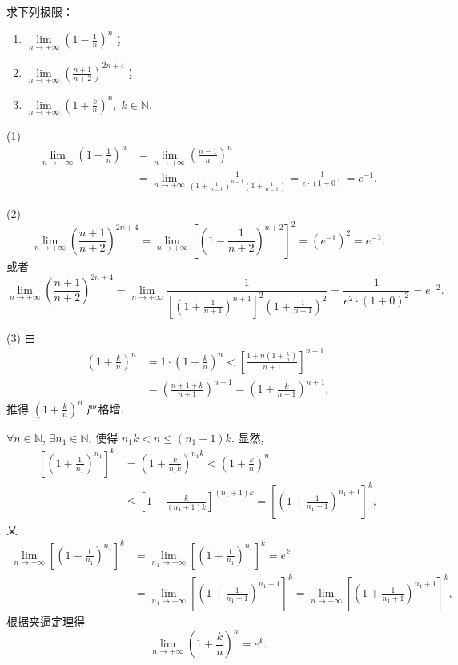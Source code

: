 \begin{example}\label{ex:1.4.8}
求下列极限：
\begin{enumerate}
\item $\lim\limits_{n \to +\infty} \left(1 - \frac{1}{n}\right)^n$；
\item $\lim\limits_{n \to +\infty} \left(\frac{n+1}{n+2}\right)^{2n+4}$；
\item $\lim\limits_{n \to +\infty} \left(1 + \frac{k}{n}\right)^n,\; k \in \mathbb{N}$.
\end{enumerate}
\end{example}

\begin{solution}
(1) 
\[
\begin{aligned}
\lim_{n\to+\infty}\left(1 - \frac{1}{n}\right)^{n} &= \lim_{n\to+\infty}\left(\frac{n-1}{n}\right)^{n} \\
&= \lim_{n\to+\infty}\frac{1}{\left(1 + \frac{1}{n-1}\right)^{n-1}\left(1 + \frac{1}{n-1}\right)} = \frac{1}{e\cdot(1 + 0)} = e^{-1}.
\end{aligned}
\]

(2) 
\[
\lim_{n\to+\infty}\left(\frac{n+1}{n+2}\right)^{2n+4} = \lim_{n\to+\infty}\left[\left(1 - \frac{1}{n+2}\right)^{n+2}\right]^2 = (e^{-1})^2 = e^{-2}.
\]
或者
\[
\lim_{n\to+\infty}\left(\frac{n+1}{n+2}\right)^{2n+4} = \lim_{n\to+\infty}\frac{1}{\left[\left(1 + \frac{1}{n+1}\right)^{n+1}\right]^{2}\left(1 + \frac{1}{n+1}\right)^{2}} = \frac{1}{e^{2}\cdot(1 + 0)^{2}} = e^{-2}.
\]

(3) 由
\[
\begin{aligned}
\left(1 + \frac{k}{n}\right)^{n} &= 1 \cdot \left(1 + \frac{k}{n}\right)^{n} < \left[\frac{1 + n\left(1 + \frac{k}{n}\right)}{n+1}\right]^{n+1} \\
&= \left(\frac{n+1+k}{n+1}\right)^{n+1} = \left(1 + \frac{k}{n+1}\right)^{n+1},
\end{aligned}
\]
推得 $\left(1 + \frac{k}{n}\right)^{n}$ 严格增.

$\forall n \in \mathbb{N}$, $\exists n_1 \in \mathbb{N}$, 使得 $n_1 k < n \leqslant (n_1 + 1)k$. 显然,
\[
\begin{aligned}
\left[\left(1 + \frac{1}{n_{1}}\right)^{n_{1}}\right]^{k} &= \left(1 + \frac{k}{n_{1}k}\right)^{n_{1}k} < \left(1 + \frac{k}{n}\right)^{n} \\
&\leqslant \left[1 + \frac{k}{(n_{1}+1)k}\right]^{(n_{1}+1)k} = \left[\left(1 + \frac{1}{n_{1}+1}\right)^{n_{1}+1}\right]^{k},
\end{aligned}
\]
又
\[
\begin{aligned}
\lim_{n\to+\infty}\left[\left(1 + \frac{1}{n_{1}}\right)^{n_{1}}\right]^{k} &= \lim_{n_{1}\to+\infty}\left[\left(1 + \frac{1}{n_{1}}\right)^{n_{1}}\right]^{k} = e^{k} \\
&= \lim_{n_{1}\to+\infty}\left[\left(1 + \frac{1}{n_{1}+1}\right)^{n_{1}+1}\right]^{k} = \lim_{n\to+\infty}\left[\left(1 + \frac{1}{n_{1}+1}\right)^{n_{1}+1}\right]^{k},
\end{aligned}
\]
根据夹逼定理得
\[
\lim_{n\to+\infty}\left(1 + \frac{k}{n}\right)^{n} = e^{k}.
\]
\end{solution}

